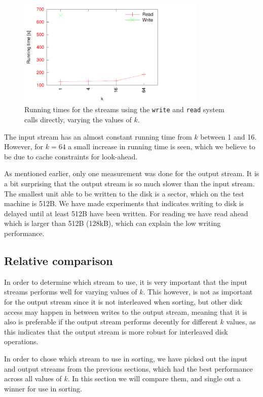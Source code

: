 \documentclass[a4paper,12pt]{article}
\begin{document}
\begin{figure}[h!]
  \centering
  \includegraphics[width=0.8\textwidth]{syscall_streams}
  \caption{Running times for the streams using the \texttt{write} and
    \texttt{read} system calls directly, varying the values of $k$.}
  \label{fig:syscall-streams}
\end{figure}

The input stream has an almost constant running time from $k$ between
1 and 16. However, for $k = 64$ a small increase in running time is
seen, which we believe to be due to cache constraints for look-ahead.

As mentioned earlier, only one measurement was done for the output
stream. It is a bit surprising that the output stream is so much
slower than the input stream. The smallest unit able to be written to
the disk is a sector, which on the test machine is 512B.  We have made experiments that indicates writing to disk is delayed until at least 512B have been
written. For reading we have read ahead which is larger than 512B (128kB), which can explain the
low writing performance.

\subsection{Relative comparison}
In order to determine which stream to use, it is very important that
the input streams performs well for varying values of $k$. This
however, is not as important for the output stream since it is not
interleaved when sorting, but other disk access may happen in between writes to the
output stream, meaning that it is also is preferable if
the output stream performs decently for different $k$ values, as this
indicates that the output stream is more robust for interleaved disk
operations.

In order to chose which stream to use in sorting, we have picked out
the input and output streams from the previous sections, which had the
best performance across all values of $k$. In this section we will
compare them, and single out a winner for use in sorting.
\end{document}
